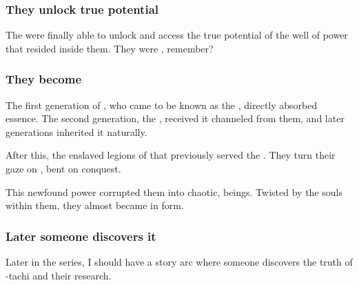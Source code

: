 \subsubsection{They unlock true potential}
The \dragons{} were finally able to unlock and access the true potential of the well of \xsic{} power that resided inside them. 
They were , remember? 





\subsubsection{They become \draecchonosh}
The first generation of \draecchonosh{}, who came to be known as the \firstgendragons{}, directly absorbed \xzaishann{} essence. The second generation, the \shaeeroths{}, received it channeled from them, and later generations inherited it naturally.

After this, the \dragons{} enslaved legions of \daemons{} that previously served the \xzaishanns. They turn their gaze on \Miith{}, bent on conquest.


This newfound power corrupted them into chaotic, \daemonic{} beings. Twisted by the \xzaishannic{} souls within them, they almost became \xzaishanns{} in \ophidian{} form. 





\subsubsection{Later someone discovers it}
Later in the series, I should have a story arc where someone discovers the truth of \Tiamat-tachi and their research. 

